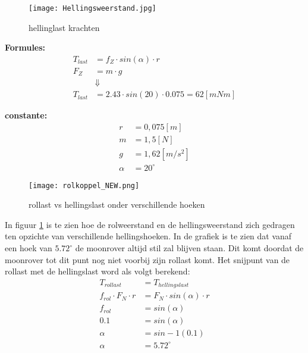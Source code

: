     \begin{figure}[H]
        \centering
        \texttt{[image: Hellingsweerstand.jpg]}
        \caption{hellinglast krachten}
    \end{figure}

    \begin{multicols}{2}
        \textbf{Formules:}
        \begin{equation}
            \begin{split}
                T_{last} &= f_{Z} \cdot sin(\alpha) \cdot r \\
                F_{Z} &= m \cdot g\\
                &\Downarrow \\
                T_{last} &= 2.43 \cdot sin(20) \cdot 0.075 = 62 [mNm]
            \end{split}
        \end{equation}

        \textbf{constante:}
        \begin{equation*}
            \begin{split}
                r &= 0,075 [m] \\
                m &= 1,5 [N] \\
                g &= 1,62 [m/s^2] \\
                \alpha &= 20^\circ 
            \end{split}
        \end{equation*}
    \end{multicols}

    \begin{figure}[H]
        \centering
        \texttt{[image: rolkoppel\_NEW.png]}
        \caption{rollast vs hellingslast onder verschillende hoeken}
        \label{fig:birds}
    \end{figure}

    In figuur \ref{fig:birds} is te zien hoe de rolweerstand en de hellingsweerstand zich gedragen ten opzichte van verschillende hellingshoeken. In de grafiek is te zien dat vanaf een hoek van $5.72^\circ$ de moonrover altijd stil zal blijven staan. Dit komt doordat de moonrover tot dit punt nog niet voorbij zijn rollast komt. Het snijpunt van de rollast met de hellingslast word als volgt berekend:
    \begin{equation}
        \begin{split}
            T_{rollast} &= T_{hellingslast} \\
            f_{rol} \cdot F_{N} \cdot r &= F_{N} \cdot sin(\alpha) \cdot r \\
            f_{rol} &= sin(\alpha) \\
            0.1 &= sin(\alpha) \\
            \alpha &= sin-1(0.1) \\
            \alpha &= 5.72^\circ
        \end{split}
    \end{equation}

